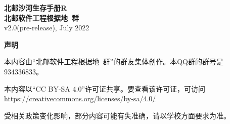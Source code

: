 \documentclass[UTF8]{ctexart}
\begin{document}
\begin{titlepage}
    \centering
    {\Huge\sffamily\bfseries 北邮沙河生存手册R} \\[6.5ex]
    {\Large\sffamily\bfseries 北邮软件工程根据地\ 群} \\
    {\large\sffamily v2.0(pre-release), July 2022}\\[1.5ex]
\end{titlepage}
\begin{titlepage}
    \centering
    {\Large\bfseries 声明}

    本内容由“北邮软件工程根据地\ 群”的群友集体创作。本QQ群的群号是934336833。

    本内容以“CC BY-SA 4.0”许可证共享。要查看该许可证，可访问\\
    \href{https://creativecommons.org/licenses/by-sa/4.0/}{https://creativecommons.org/licenses/by-sa/4.0/}

    受相关政策变化影响，部分内容可能有失准确，请以学校方面要求为准。
    \tableofcontents
\end{titlepage}


















\end{document}
